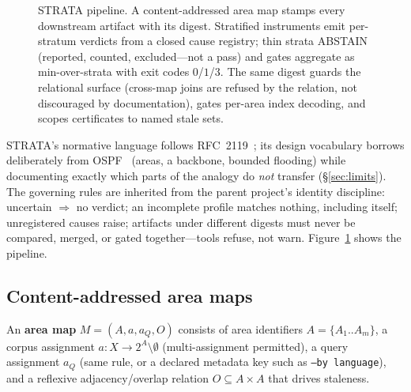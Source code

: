 \documentclass[sigconf, nonacm]{acmart}
\begin{document}
\begin{figure}[t]
{}
\caption{STRATA pipeline. A content-addressed area map stamps every
downstream artifact with its digest. Stratified instruments emit
per-stratum verdicts from a closed cause registry; thin strata ABSTAIN
(reported, counted, excluded---not a pass) and gates aggregate as
min-over-strata with exit codes $0$/$1$/$3$. The same digest guards the
relational surface (cross-map joins are refused by the relation, not
discouraged by documentation), gates per-area index decoding, and scopes
certificates to named stale sets.}
\label{fig:arch}
\end{figure}

STRATA's normative language follows RFC~2119~\cite{rfc2119}; its design
vocabulary borrows deliberately from OSPF~\cite{rfc2328} (areas, a
backbone, bounded flooding) while documenting exactly which parts of the
analogy do \emph{not} transfer (\S\ref{sec:limits}). The governing rules
are inherited from the parent project's identity discipline: uncertain
$\Rightarrow$ no verdict; an incomplete profile matches nothing, including
itself; unregistered causes raise; artifacts under different digests must
never be compared, merged, or gated together---tools refuse, not warn.
Figure~\ref{fig:arch} shows the pipeline.

\subsection{Content-addressed area maps}
\label{sec:areamap}

An \textbf{area map} $M = (A, a, a_Q, O)$ consists of area identifiers
$A=\{A_1..A_m\}$, a corpus assignment $a : X \to 2^A \setminus \emptyset$
(multi-assignment permitted), a query assignment $a_Q$ (same rule, or a
declared metadata key such as \texttt{--by language}), and a reflexive
adjacency/overlap relation $O \subseteq A \times A$ that drives staleness.
\end{document}
